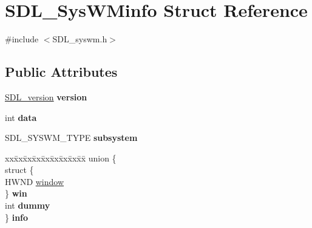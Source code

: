 \hypertarget{structSDL__SysWMinfo}{\section{S\+D\+L\+\_\+\+Sys\+W\+Minfo Struct Reference}
\label{structSDL__SysWMinfo}
}


{\ttfamily \#include $<$S\+D\+L\+\_\+syswm.\+h$>$}

\subsection*{Public Attributes}
\begin{DoxyCompactItemize}
\item 
\hypertarget{structSDL__SysWMinfo_ac3a70af022d4849e9ff546595e94627f}{\hyperlink{structSDL__version}{S\+D\+L\+\_\+version} {\bfseries version}}\label{structSDL__SysWMinfo_ac3a70af022d4849e9ff546595e94627f}

\item 
\hypertarget{structSDL__SysWMinfo_ac69151baa9187a402f9f9e4ce9ed7c8a}{int {\bfseries data}}\label{structSDL__SysWMinfo_ac69151baa9187a402f9f9e4ce9ed7c8a}

\item 
\hypertarget{structSDL__SysWMinfo_a438b6a06ab3ee417293c7b7fc5a23855}{S\+D\+L\+\_\+\+S\+Y\+S\+W\+M\+\_\+\+T\+Y\+P\+E {\bfseries subsystem}}\label{structSDL__SysWMinfo_a438b6a06ab3ee417293c7b7fc5a23855}

\item 
\hypertarget{structSDL__SysWMinfo_a82a89236fd81cd1a964aebed3ff6ebd1}{\begin{tabbing}
xx\=xx\=xx\=xx\=xx\=xx\=xx\=xx\=xx\=\kill
union \{\\
\hypertarget{unionSDL__SysWMinfo_1_1@18_a9b0569472787e43a00fc0e97a79ba1a8}{\>struct \{\\
\>\>HWND \hyperlink{structSDL__SysWMinfo_af06225591ff07e837bbd037728a525b9}{window}\\
\>\} {\bfseries win}\\
\hypertarget{unionSDL__SysWMinfo_1_1@18_a1edbb8fc4fc59081efe6070f9167c1cf}{\>int {\bfseries dummy}\\
\} {\bfseries info}}\label{structSDL__SysWMinfo_a82a89236fd81cd1a964aebed3ff6ebd1}
\\

}
\end{tabbing}}
\end{DoxyCompactItemize}
